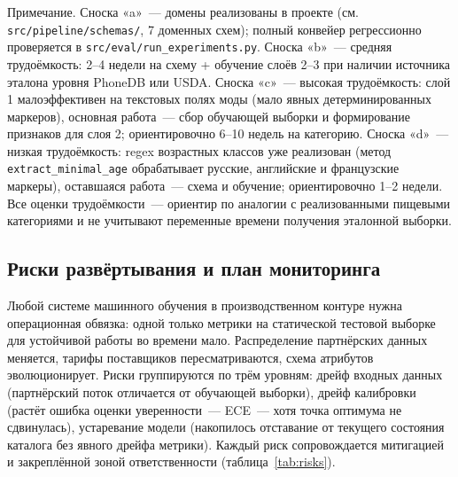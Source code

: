 Примечание. Сноска «a»~--- домены реализованы в проекте (см. \texttt{src/pipeline/schemas/}, 7 доменных схем); полный конвейер регрессионно проверяется в \texttt{src/eval/run\_experiments.py}. Сноска «b»~--- средняя трудоёмкость: 2--4 недели на схему + обучение слоёв 2--3 при наличии источника эталона уровня PhoneDB или USDA. Сноска «c»~--- высокая трудоёмкость: слой 1 малоэффективен на текстовых полях моды (мало явных детерминированных маркеров), основная работа~--- сбор обучающей выборки и формирование признаков для слоя 2; ориентировочно 6--10 недель на категорию. Сноска «d»~--- низкая трудоёмкость: regex возрастных классов уже реализован (метод \texttt{extract\_minimal\_age} обрабатывает русские, английские и французские маркеры), оставшаяся работа~--- схема и обучение; ориентировочно 1--2 недели. Все оценки трудоёмкости~--- ориентир по аналогии с реализованными пищевыми категориями и не учитывают переменные времени получения эталонной выборки.

\subsection{Риски развёртывания и план мониторинга}

Любой системе машинного обучения в производственном контуре нужна операционная обвязка: одной только метрики на статической тестовой выборке для устойчивой работы во времени мало. Распределение партнёрских данных меняется, тарифы поставщиков пересматриваются, схема атрибутов эволюционирует. Риски группируются по трём уровням: дрейф входных данных (партнёрский поток отличается от обучающей выборки), дрейф калибровки (растёт ошибка оценки уверенности~--- ECE~--- хотя точка оптимума не сдвинулась), устаревание модели (накопилось отставание от текущего состояния каталога без явного дрейфа метрики). Каждый риск сопровождается митигацией и закреплённой зоной ответственности (таблица~\ref{tab:risks}).

